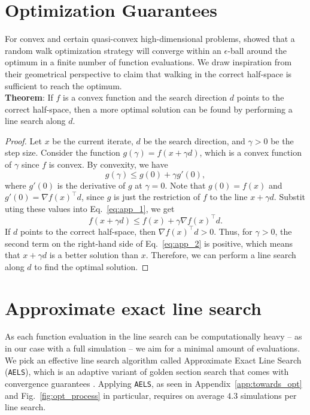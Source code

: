 \appendix

\section{Optimization Guarantees}
\label{app:opt_guarantees}
For convex and certain quasi-convex high-dimensional problems, \citet{Golovin2020} showed that a random walk optimization strategy will converge within an $\epsilon$-ball around the optimum in a finite number of function evaluations. We draw inspiration from their geometrical perspective to claim that walking in the correct half-space is sufficient to reach the optimum. \\

\noindent
\textbf{Theorem}: If $f$ is a convex function and the search direction $d$ points to the correct half-space, then a more optimal solution can be found by performing a line search along $d$.

\noindent
\begin{proof}
Let $x$ be the current iterate, $d$ be the search direction, and $\gamma > 0$ be the step size. Consider the function $g(\gamma) = f(x + \gamma d)$, which is a convex function of $\gamma$ since $f$ is convex. By convexity, we have
\begin{equation}
g(\gamma) \leq g(0) + \gamma g'(0),
\label{eq:app_1}
\end{equation}
where $g'(0)$ is the derivative of $g$ at $\gamma=0$. Note that $g(0) = f(x)$ and $g'(0) = \nabla f(x)^\top d$, since $g$ is just the restriction of $f$ to the line $x + \gamma d$. Substit
uting these values into Eq.~\eqref{eq:app_1}, we get
\begin{equation}
f(x + \gamma d) \leq f(x) + \gamma \nabla f(x)^\top d.
\label{eq:app_2}
\end{equation}
If $d$ points to the correct half-space, then $\nabla f(x)^\top d > 0$. Thus, for $\gamma>0$, the second term on the right-hand side of Eq.~\eqref{eq:app_2} is positive, which means that $x+\gamma d$ is a better solution than $x$. Therefore, we can perform a line search along $d$ to find the optimal solution.
\end{proof}

\section{Approximate exact line search}
\label{app:line_search}
As each function evaluation in the line search can be computationally heavy – as in our case with a full simulation – we aim for a minimal amount of evaluations. We pick an effective line search algorithm called Approximate Exact Line Search (\texttt{AELS}), which is an adaptive variant of golden section search that comes with convergence guarantees \citep{Fridovich-Keil2020}. Applying \texttt{AELS}, as seen in Appendix~\ref{app:towards_opt} and Fig.~\ref{fig:opt_process} in particular, requires on average $4.3$ simulations per line search.

